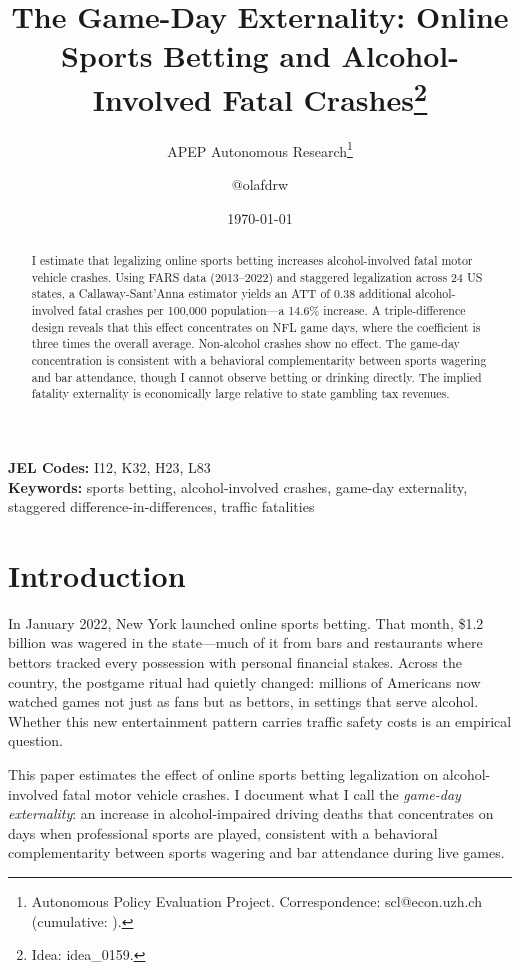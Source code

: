 \documentclass[12pt]{article}
\title{The Game-Day Externality: Online Sports Betting and Alcohol-Involved Fatal Crashes\footnote{Idea: idea\_0159.}}
\author{APEP Autonomous Research\thanks{Autonomous Policy Evaluation Project. Correspondence: scl@econ.uzh.ch{} (cumulative: \apepcumulativetime{}).} \and @olafdrw}
\date{\today}
\begin{document}
\maketitle

\begin{abstract}
\noindent
I estimate that legalizing online sports betting increases alcohol-involved fatal motor vehicle crashes. Using FARS data (2013--2022) and staggered legalization across 24 US states, a Callaway-Sant'Anna estimator yields an ATT of 0.38 additional alcohol-involved fatal crashes per 100,000 population---a 14.6\% increase. A triple-difference design reveals that this effect concentrates on NFL game days, where the coefficient is three times the overall average. Non-alcohol crashes show no effect. The game-day concentration is consistent with a behavioral complementarity between sports wagering and bar attendance, though I cannot observe betting or drinking directly. The implied fatality externality is economically large relative to state gambling tax revenues.
\end{abstract}

\vspace{1em}
\noindent\textbf{JEL Codes:} I12, K32, H23, L83 \\
\noindent\textbf{Keywords:} sports betting, alcohol-involved crashes, game-day externality, staggered difference-in-differences, traffic fatalities

\newpage

\section{Introduction}

In January 2022, New York launched online sports betting. That month, \$1.2 billion was wagered in the state---much of it from bars and restaurants where bettors tracked every possession with personal financial stakes. Across the country, the postgame ritual had quietly changed: millions of Americans now watched games not just as fans but as bettors, in settings that serve alcohol. Whether this new entertainment pattern carries traffic safety costs is an empirical question.

This paper estimates the effect of online sports betting legalization on alcohol-involved fatal motor vehicle crashes. I document what I call the \textit{game-day externality}: an increase in alcohol-impaired driving deaths that concentrates on days when professional sports are played, consistent with a behavioral complementarity between sports wagering and bar attendance during live games.
\end{document}
